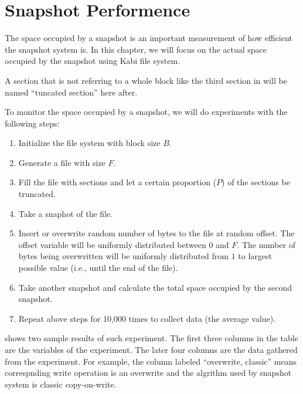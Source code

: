 \chapter{Snapshot Performence}
\label{chap:perform}

    The space occupied by a snapshot is an important measurement of how efficient the snapshot system is. In this chapter, we will focus on the actual space occupied by the snapshot using Kabi file system.
    
    A section that is not referring to a whole block like the third section in  will be named ``tuncated section'' here after.

    To monitor the space occupied by a snapshot, we will do experiments with the following steps:

\begin{enumerate}
	\item Initialize the file system with block size $B$.

	\item Generate a file with size $F$.

	\item Fill the file with sections and let a certain proportion ($P$) of the sections be truncated.

	\item Take a snaphot of the file.
	
	\item Insert or overwrite random number of bytes to the file at random offset. The offset variable will be uniformly distributed between $0$ and $F$. The number of bytes being overwritten will be uniformly distributed from $1$ to largest possible value (i.e., until the end of the file).

	\item Take another snapshot and calculate the total space occupied by the second snapshot.

	\item Repeat above steps for 10,000 times to collect data (the average value).
\end{enumerate}

     shows two sample results of such experiment. The first three columns in the table are the variables of the experiment. The later four columns are the data gathered from the experiment. For example, the column labeled ``overwrite, classic'' means correspnding write operation is an overwrite and the algrithm used by snapshot system is classic copy-on-write.

